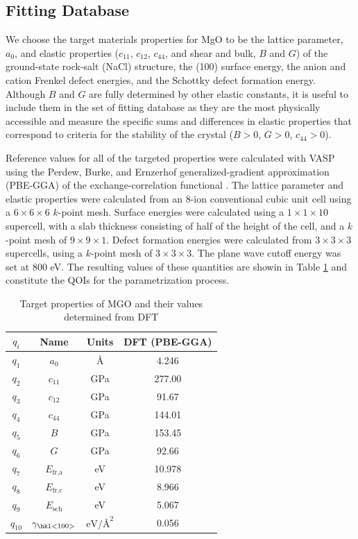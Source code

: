 \subsection{Fitting Database}

We choose the target materials properties for MgO to be the lattice parameter, $a_0$, and elastic properties ($c_{11}$, $c_{12}$, $c_{44}$, and shear and bulk, $B$ and $G$) of the ground-state rock-salt (NaCl) structure, the \hkl(100) surface energy, the anion and cation Frenkel defect energies, and the Schottky defect formation energy.  Although $B$ and $G$ are fully determined by other elastic constants, it is useful to include them in the set of fitting database as they are the most physically accessible and measure the specific sums and differences in elastic properties that correspond to criteria for the stability of the crystal ($B > 0$, $G > 0$, $c_{44}> 0$).

Reference values for all of the targeted properties were calculated with VASP\cite{kresse1993_vasp,kresse1996_vasp1,kresse1996_vasp2} using the Perdew, Burke, and Ernzerhof generalized-gradient approximation (PBE-GGA) of the exchange-correlation functional \cite{perdew1996_gga_pbe}.
The lattice parameter and elastic properties were calculated from an 8-ion conventional cubic unit cell using a $6 \times 6 \times 6$ $k$-point mesh.  Surface energies were calculated using a $1 \times 1 \times 10$ supercell, with a slab thickness consisting of half of the height of the cell, and a $k$-point mesh of $9 \times 9 \times 1$.  Defect formation energies were calculated from $3 \times 3 \times 3$ supercells, using a $k$-point mesh of $3 \times 3 \times 3$.  The plane wave cutoff energy was set at $800$ eV. The resulting values of these quantities are showin in Table \ref{tbl:MgO_target} and constitute the QOIs for the parametrization process.

\begin{table}[ht]
	\caption[Target Properties of MgO]{Target properties of MGO and their values determined from DFT}
	\label{tbl:MgO_target}
	\centering
	\begin{tabular}{cccc}
		\hline
		 $q_i$ & Name & Units & {DFT (PBE-GGA)} \\
		\hline
    $q_1$ & $a_0$     & \AA   &	4.246 \\
    $q_2$ & $c_{11}$  & GPa   & 277.00 \\
    $q_3$ & $c_{12}$  & GPa   & 91.67 \\
    $q_4$ & $c_{44}$  & GPa 	& 144.01 \\
		$q_5$ & $B$       & GPa   & 153.45 \\
    $q_6$ & $G$       & GPa   & 92.66 \\
		$q_7$ & $E_{\text{fr,a}}$ & eV & 	10.978 \\
		$q_8$ & $E_{\text{fr,c}}$ & eV & 8.966 \\
		$q_9$ & $E_{\text{sch}}$ & eV &	5.067 \\
		$q_{10}$ & $\gamma_{\text{\hkl<100>}}$ & $\text{eV/\AA}^2$ &	0.056 \\
		\hline
	\end{tabular}
\end{table}

